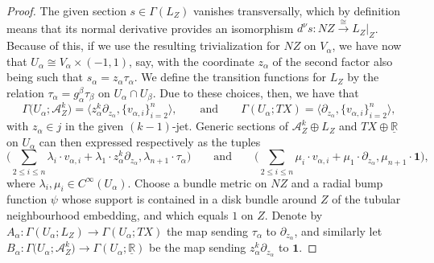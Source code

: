 \documentclass[10pt,a4paper]{amsart}
\numberwithin{equation}{section}
\begin{document}
\begin{proof}
The given section $s \in \Gamma(L_Z)$ vanishes transversally, which by definition means that its normal derivative provides an isomorphism $d^\nu s\colon NZ \stackrel{\cong}{\to} L_Z|_Z$. Because of this, if we use the resulting trivialization for $NZ$ on $V_\alpha$, we have now that $U_\alpha \cong V_\alpha \times (-1,1)$, say, with the coordinate $z_\alpha$ of the second factor also being such that $s_\alpha = z_\alpha \tau_\alpha$. We define the transition functions for $L_Z$ by the relation $\tau_\alpha = g_\alpha^\beta \tau_\beta$ on $U_\alpha \cap U_\beta$. Due to these choices, then, we have that
\begin{displaymath}
	\Gamma\big(U_\alpha; \mathcal{A}_Z^k\big) = \big\langle z_\alpha^k \partial_{z_\alpha}, \{v_{\alpha,i}\}_{i=2}^n\big\rangle, \qquad \text{and} \qquad \Gamma(U_\alpha;TX) = \big\langle \partial_{z_\alpha}, \{v_{\alpha,i}\}_{i=2}^n \big\rangle,
\end{displaymath}
with $z_\alpha \in j$ in the given $(k-1)$-jet. Generic sections of $\mathcal{A}_Z^k \oplus L_Z$ and $TX \oplus \underline{\mathbb{R}}$ on $U_\alpha$ can then expressed respectively as the tuples
\begin{displaymath}
	\bigg(\sum_{2 \leq i \leq n} \lambda_i \cdot v_{\alpha,i} + \lambda_1 \cdot z_\alpha^k \partial_{z_\alpha}, \lambda_{n+1} \cdot \tau_\alpha\bigg) \qquad \text{and} \qquad \bigg(\sum_{2\leq i \leq n} \mu_i \cdot v_{\alpha,i} + \mu_1 \cdot \partial_{z_\alpha}, \mu_{n+1} \cdot \mathbf{1}\bigg),
\end{displaymath}
where $\lambda_i, \mu_i \in C^\infty(U_\alpha)$. Choose a bundle metric on $NZ$ and a radial bump function $\psi$ whose support is contained in a disk bundle around $Z$ of the tubular neighbourhood embedding, and which equals $1$ on $Z$. Denote by $A_\alpha\colon \Gamma(U_\alpha;L_Z) \to \Gamma(U_\alpha;TX)$ the map sending $\tau_\alpha$ to $\partial_{z_\alpha}$, and similarly let $B_\alpha\colon \Gamma\big(U_\alpha;\mathcal{A}_Z^k\big) \to \Gamma(U_\alpha; \underline{\mathbb{R}})$ be the map sending $z_\alpha^k \partial_{z_\alpha}$ to $\mathbf{1}$.


\end{proof}
\end{document}
